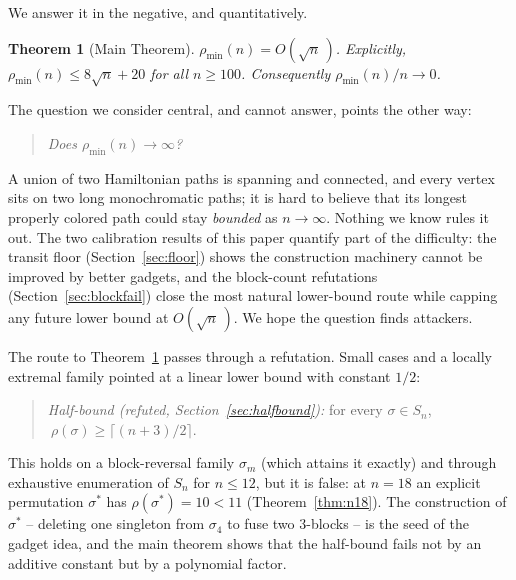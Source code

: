 \documentclass[11pt]{article}
\newtheorem{theorem}{Theorem}[section]
\theoremstyle{definition}
\newcommand{\pmin}{\rho_{\min}}
\begin{document}
We answer it in the negative, and quantitatively.

\begin{theorem}[Main Theorem]\label{thm:main-intro}
$\pmin(n) = O(\sqrt n\,)$. Explicitly, $\pmin(n) \le 8\sqrt n + 20$ for all
$n \ge 100$. Consequently $\pmin(n)/n \to 0$.
\end{theorem}

The question we consider central, and cannot answer, points the other way:

\begin{quote}
\emph{Does $\pmin(n) \to \infty$?}
\end{quote}

A union of two Hamiltonian paths is spanning and connected, and every vertex sits on
two long monochromatic paths; it is hard to believe that its longest properly colored
path could stay \emph{bounded} as $n \to \infty$. Nothing we know rules it out. The
two calibration results of this paper quantify part of the difficulty: the transit
floor (Section~\ref{sec:floor}) shows the construction machinery cannot be improved by
better gadgets, and the block-count refutations (Section~\ref{sec:blockfail}) close
the most natural lower-bound route while capping any future lower bound at
$O(\sqrt n\,)$. We hope the question finds attackers.

The route to Theorem~\ref{thm:main-intro} passes through a refutation. Small cases
and a locally extremal family pointed at a linear lower bound with constant $1/2$:

\begin{quote}
\emph{Half-bound (refuted, Section~\ref{sec:halfbound}):} for every $\sigma\in S_n$,
$\ \rho(\sigma) \ge \lceil (n+3)/2 \rceil$.
\end{quote}

This holds on a block-reversal family $\sigma_m$ (which attains it exactly) and through
exhaustive enumeration of $S_n$ for $n\le 12$, but it is false: at $n=18$ an explicit
permutation $\sigma^*$ has $\rho(\sigma^*)=10<11$ (Theorem~\ref{thm:n18}). The
construction of $\sigma^*$ -- deleting one singleton from $\sigma_4$ to fuse two
$3$-blocks -- is the seed of the gadget idea, and the main theorem shows that the
half-bound fails not by an additive constant but by a polynomial factor.
\end{document}
